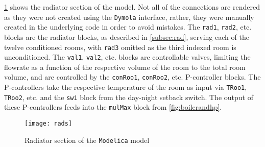 \cref{fig:radssec} shows the radiator section of the model. Not all of the connections are rendered as they were not created using the \texttt{Dymola} interface, rather, they were manually created in the underlying code in order to avoid mistakes. The \texttt{rad1}, \texttt{rad2}, etc. blocks are the radiator blocks, as described in \cref{subsec:rad}, serving each of the twelve conditioned rooms, with \texttt{rad3} omitted as the third indexed room is unconditioned. The \texttt{val1}, \texttt{val2}, etc. blocks are controllable valves, limiting the flowrate as a function of the respective volume of the room to the total room volume, and are controlled by the \texttt{conRoo1}, \texttt{conRoo2}, etc. P-controller blocks. The P-controllers take the respective temperature of the room as input via \texttt{TRoo1}, \texttt{TRoo2}, etc. and the \texttt{swi} block from the day-night setback switch. The output of these P-controllers feeds into the \texttt{mulMax} block from \cref{fig:boilerandhp}.
\begin{figure}[htb]
    \centering
    \texttt{[image: rads]}
    \caption{Radiator section of the \texttt{Modelica} model}
    \label{fig:radssec}
\end{figure}